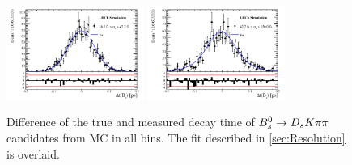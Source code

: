 \begin{figure}[h]
\includegraphics[height=!,width=0.4\textwidth]{figs/Resolution/SignalMC_bin_7.pdf}
\includegraphics[height=!,width=0.4\textwidth]{figs/Resolution/SignalMC_bin_8.pdf}
\caption{Difference of the true and measured decay time of ${{B}^0_{s}}\rightarrow{\ensuremath{{D}_{s}}}{\ensuremath{K}}{\ensuremath{\pi}}{\ensuremath{\pi}}$ candidates from MC in all bins. The fit described in \ref{sec:Resolution} is overlaid.}
\label{fig:massfits_signal_Run2}
\end{figure}
